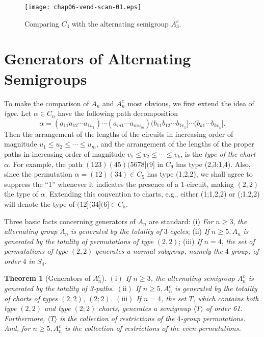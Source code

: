 \documentclass{surv-l}
\numberwithin{equation}{section}
\numberwithin{table}{section}
\numberwithin{figure}{section}
\theoremstyle{plain}
\newtheorem{theorem}[equation]{Theorem}
\theoremstyle{definition}
\begin{document}
\setcounter{figure}{3}
\begin{figure}[!h]
\texttt{[image: chap06-vend-scan-01.eps]}
\caption{Comparing $C_{3}$ with the alternating semigroup
$A_{3}^{c}$.}\label{fig6.25.4}
\end{figure}

\section{Generators of Alternating Semigroups}\label{sec6.26}

To make the comparison of $A_{n}$ and $A_{n}^{c}$ most obvious, we
first extend the idea of \emph{type}. Let $\alpha\in C_{n}$ have
the following path decomposition
\[
\alpha=(a_{11}a_{12}\cdots a_{1u_{1}})\cdots(a_{m1}\cdots
a_{mu_{m}})(b_{11}b_{12}\cdots b_{1v_{1}}]\cdots(b_{k1}\cdots
b_{kv_{k}}].
\]
Then the arrangement of the lengths of the circuits in increasing
order of magnitude $u_{1}\leq u_{2}\leq\cdots\leq u_{m}$, and the
arrangement of the lengths of the proper paths in increasing order
of magnitude $v_{1}\leq v_{2}\leq\cdots\leq v_{k}$, is the
\emph{type of the chart} $\alpha$. For example, the path
$(123)(45)(5678](9]$ in $C_{9}$ has type (2,3;1,4). Also, since
the permutation $\alpha=(12)(34)\in C_{5}$ has type (1,2,2), we
shall agree to suppress the ``1'' whenever it indicates the
presence of a 1-circuit, making $(2,2)$ the type of $\alpha$.
Extending this convention to charts, e.g., either (1;1,2,2) or
(;1,2,2) will denote the type of $(12](34](6]\in C_{5}$.

Three basic facts concerning generators
of $A_{n}$ are standard: (i)
\emph{For} $n \geq 3$, \emph{the alternating
group} $A_{n}$ \emph{is generated by the
totality of} 3-\emph{cycles}; (ii) \emph{If} $n \geq 5, A_{n}$
\emph{is generated by the totality of permutations of type} $(2,2)$;
(iii) \emph{If} $n =4$, \emph{the set of permutations of type}
$(2,2)$ \emph{generates a normal subgroup, namely the} 4-\emph{group,
of order} 4 \emph{in} $S_{4}$.

\begin{theorem}[Generators of $A_{n}^{c}$]\label{thm6.26.1}
$(\mathrm{i})$ If $n \geq 3$, the alternating semigroup
$A_{n}^{c}$ is generated by the totality of 3-paths.
$\mathrm{(ii)}$ If $n \geq 5, A_{n}^{c}$ is generated by the
totality of charts of types $(2, 2)$, $(2; 2)$. $(\mathrm{iii})$
If $n =4$, the set $T$, which contains both type $(2, 2)$ and type
$(2; 2)$ charts, generates a semigroup $\langle T\rangle$ of order
61. Furthermore, $\langle T\rangle$ is the collection of
restrictions of the $4$-group permutations. And, for $n \geq 5,
A_{n}^{c}$ is the collection of restrictions of the even
permutations.
\end{theorem}
\end{document}
